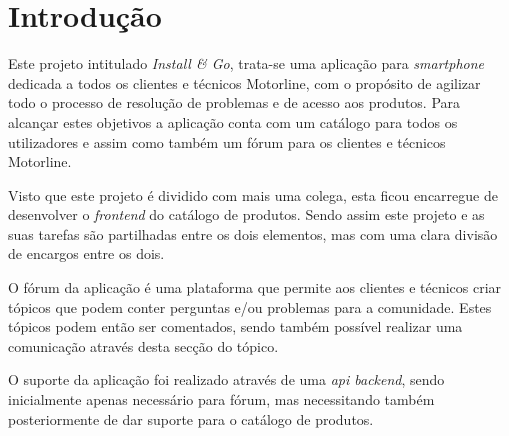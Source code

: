 
\chapter{Introdução}
Este projeto intitulado \textit{Install \& Go}, trata-se uma aplicação para \textit{smartphone} dedicada a todos os clientes e 
técnicos Motorline, com o propósito de agilizar todo o processo de resolução de problemas e de acesso 
aos produtos. Para alcançar estes objetivos a aplicação conta com um catálogo para todos os utilizadores 
e assim como também um fórum para os clientes e técnicos Motorline.


Visto que este projeto é dividido com mais uma colega, esta ficou encarregue de desenvolver 
o \textit{frontend} do catálogo de produtos. Sendo assim este projeto e as suas tarefas são partilhadas entre os dois elementos, 
mas com uma clara divisão de encargos entre os dois.


O fórum da aplicação é uma plataforma que permite aos clientes e técnicos criar tópicos que podem conter 
perguntas e/ou problemas para a comunidade. Estes tópicos podem então 
ser comentados, sendo também possível realizar uma comunicação através desta secção do tópico.

O suporte da aplicação foi realizado através de uma \textit{api backend}, sendo inicialmente apenas 
necessário para fórum, mas necessitando também posteriormente de dar suporte para o catálogo de produtos.





